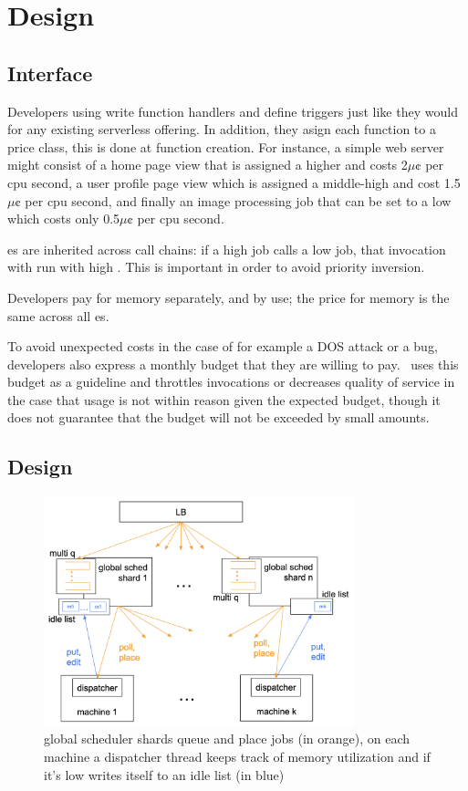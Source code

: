 \section{Design}\label{design}



\subsection{Interface}


Developers using \sys{} write function handlers and define triggers just like
they would for any existing serverless offering. In addition, they asign each
function to a price class, this is done at function creation. For instance, a
simple web server might consist of a home page view that is assigned a higher
\priceclass{} and costs 2$\mu\cent$ per cpu second, a user profile page view
which is assigned a middle-high \class{} and cost 1.5$\mu\cent$ per cpu second,
and finally an image processing job that can be set to a low \class{} which
costs only 0.5$\mu\cent$ per cpu second.

\Class{}es are inherited across call chains: if a high \class{} job calls a low
\class{} job, that invocation with run with high \class{}. This is important in
order to avoid priority inversion.

Developers pay for memory separately, and by use; the price for memory is the
same across all \class{}es.

To avoid unexpected costs in the case of for example a DOS attack or a bug,
developers also express a monthly budget that they are willing to pay.\ \sys{}
uses this budget as a guideline and throttles invocations or decreases quality
of service in the case that usage is not within reason given the expected
budget, though it does not guarantee that the budget will not be exceeded by
small amounts.



\subsection{\Sys{} Design}

\begin{figure}[t]
    \centering
      \includegraphics[width=9cm]{img/overview.png}
      \caption{ global scheduler shards queue and place jobs (in orange), 
      on each machine a dispatcher thread keeps track of memory utilization 
      and if it's low writes itself to an idle list (in blue) }
    \label{fig:overview}
\end{figure}



